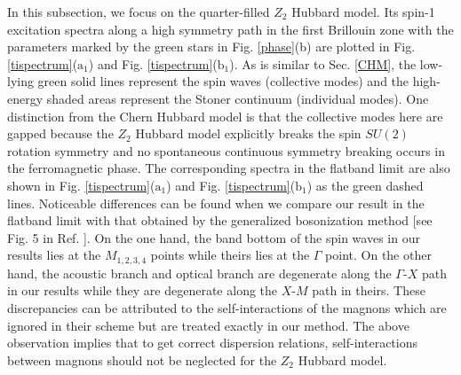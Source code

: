 \documentclass[amsmath,superscriptaddress,showpacs,aps,prb,twocolumn]{revtex4-1}
\begin{document}
\par In this subsection, we focus on the quarter-filled $Z_2$ Hubbard model. Its spin-1 excitation spectra along a high symmetry path in the first Brillouin zone with the parameters marked by the green stars in Fig. \ref{phase}(b) are plotted in Fig. \ref{tispectrum}($\text{a}_1$) and Fig. \ref{tispectrum}($\text{b}_1$). As is similar to Sec. \ref{CHM}, the low-lying green solid lines represent the spin waves (collective modes) and the high-energy shaded areas represent the Stoner continuum (individual modes). One distinction from the Chern Hubbard model is that the collective modes here are gapped because the $Z_2$ Hubbard model explicitly breaks the spin $SU(2)$ rotation symmetry and no spontaneous continuous symmetry breaking occurs in the ferromagnetic phase. The corresponding spectra in the flatband limit are also shown in Fig. \ref{tispectrum}($\text{a}_1$) and Fig. \ref{tispectrum}($\text{b}_1$) as the green dashed lines. Noticeable differences can be found when we compare our result in the flatband limit with that obtained by the generalized bosonization method [see Fig. 5 in Ref. \cite{DG_PRB2015}]. On the one hand, the band bottom of the spin waves in our results lies at the $M_{1,2,3,4}$ points while theirs lies at the $\Gamma$ point. On the other hand, the acoustic branch and optical branch are degenerate along the $\Gamma$-$X$ path in our results while they are degenerate along the $X$-$M$ path in theirs. These discrepancies can be attributed to the self-interactions of the magnons which are ignored in their scheme but are treated exactly in our method. The above observation implies that to get correct dispersion relations, self-interactions between magnons should not be neglected for the $Z_2$ Hubbard model.
\end{document}
